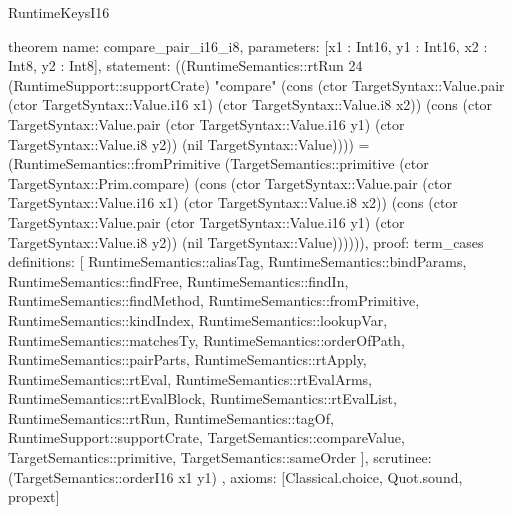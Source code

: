 \begin{lexlean}{RuntimeKeysI16}
\begin{semanticmodule}
theorem{
  name: compare_pair_i16_i8,
  parameters: [x1 : Int16, y1 : Int16, x2 : Int8, y2 : Int8],
  statement: ((RuntimeSemantics::rtRun 24 (RuntimeSupport::supportCrate) "compare" (cons (ctor TargetSyntax::Value.pair (ctor TargetSyntax::Value.i16 x1) (ctor TargetSyntax::Value.i8 x2)) (cons (ctor TargetSyntax::Value.pair (ctor TargetSyntax::Value.i16 y1) (ctor TargetSyntax::Value.i8 y2)) (nil TargetSyntax::Value)))) = (RuntimeSemantics::fromPrimitive (TargetSemantics::primitive (ctor TargetSyntax::Prim.compare) (cons (ctor TargetSyntax::Value.pair (ctor TargetSyntax::Value.i16 x1) (ctor TargetSyntax::Value.i8 x2)) (cons (ctor TargetSyntax::Value.pair (ctor TargetSyntax::Value.i16 y1) (ctor TargetSyntax::Value.i8 y2)) (nil TargetSyntax::Value)))))),
  proof: term_cases{
    definitions: [
      RuntimeSemantics::aliasTag,
      RuntimeSemantics::bindParams,
      RuntimeSemantics::findFree,
      RuntimeSemantics::findIn,
      RuntimeSemantics::findMethod,
      RuntimeSemantics::fromPrimitive,
      RuntimeSemantics::kindIndex,
      RuntimeSemantics::lookupVar,
      RuntimeSemantics::matchesTy,
      RuntimeSemantics::orderOfPath,
      RuntimeSemantics::pairParts,
      RuntimeSemantics::rtApply,
      RuntimeSemantics::rtEval,
      RuntimeSemantics::rtEvalArms,
      RuntimeSemantics::rtEvalBlock,
      RuntimeSemantics::rtEvalList,
      RuntimeSemantics::rtRun,
      RuntimeSemantics::tagOf,
      RuntimeSupport::supportCrate,
      TargetSemantics::compareValue,
      TargetSemantics::primitive,
      TargetSemantics::sameOrder
    ],
    scrutinee: (TargetSemantics::orderI16 x1 y1)
  },
  axioms: [Classical.choice, Quot.sound, propext]
}


\end{semanticmodule}
\end{lexlean}

